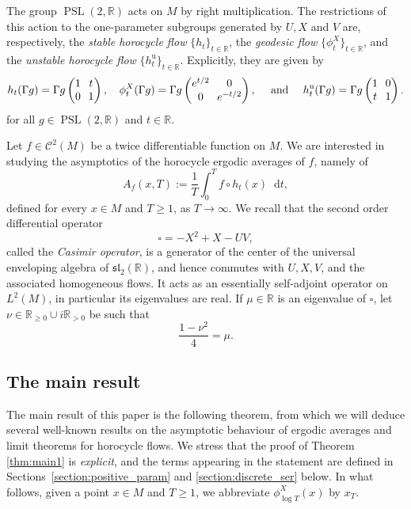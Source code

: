 \documentclass[11pt]{article}
\newcommand \R{\mathbb{R}}
\newcommand*{\diff}{\mathop{}\!\mathrm{d}}
\newcommand{\aver}[1]{A_{#1}(x,T)}
\DeclareMathOperator{\PSL}{PSL}
\DeclareMathOperator{\un}{u}
\theoremstyle{definition}
\begin{document}
The group $\PSL(2,\R)$ acts on $M$ by right multiplication.
The restrictions of this action to the one-parameter subgroups generated by $U, X$ and $V$ are, respectively, the \emph{stable horocycle flow} $\{h_t\}_{t \in \R}$, the \emph{geodesic flow} $\{\phi^X_t\}_{t \in \R}$, and the \emph{unstable horocycle flow} $\{h^{\un}_t\}_{t \in \R}$.
Explicitly, they are given by\enlargethispage{.5\baselineskip}
\[\arraycolsep3.5pt
h_t(\Gamma g) = \Gamma g
\begin{pmatrix}
1 & t \\
0 & 1
\end{pmatrix},
\quad
\phi^X_t(\Gamma g) = \Gamma g
\begin{pmatrix}
e^{t/2} & 0 \\
0 & e^{-t/2}
\end{pmatrix},
\quad \text{ and } \quad
h^{\un}_t(\Gamma g) = \Gamma g
\begin{pmatrix}
1 & 0 \\
t & 1
\end{pmatrix}.
\]
for all $g \in \PSL(2,\R)$ and $t \in \R$.

Let $f \in \mathscr{C}^2(M)$ be a twice differentiable function on $M$.
We are interested in studying the asymptotics of the horocycle ergodic averages of $f$, namely of\vspace*{-3pt}
\[
\aver{f} := \frac{1}{T} \int_0^T f \circ h_t (x) \diff t,
\]
defined for every $x \in M$ and $T \geq 1$, as $T \to \infty$.
We recall that the second order differential operator\vspace*{-3pt}
\[
\square = -X^2+X-UV,
\]
called the \emph{Casimir operator}, is a generator of the center of the universal enveloping algebra of $\mathfrak{sl}_2(\R)$, and hence commutes with $U, X, V$, and the associated homogeneous flows.
It acts as an essentially self-adjoint operator on $L^2(M)$, in particular its eigenvalues are real.
If $\mu \in\R$ is an eigenvalue of $\square$, let $\nu \in \R_{\geq 0 } \cup i \R_{>0}$ be such that\vspace*{-3pt}
\[
\frac{1-\nu^2}{4} = \mu.
\]

\subsection{The main result}

The main result of this paper is the following theorem, from which we will deduce several well-known results on the asymptotic behaviour of ergodic averages and limit theorems for horocycle flows.
We stress that the proof of Theorem \ref{thm:main1} is \emph{explicit}, and the terms appearing in the statement are defined in Sections~\ref{section:positive_param} and \ref{section:discrete_ser} below.
In what follows, given a point $x\in M$ and $T\geq 1$, we abbreviate $\phi^X_{\log T}(x)$ by $x_T$.
\end{document}
